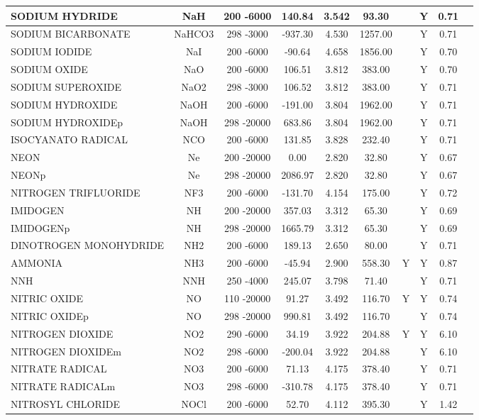 \begin{longtable}{@{\extracolsep{\fill}}|l|c|c|c|c|c|c|c|c|l|}
SODIUM HYDRIDE&NaH&200 -6000&  140.84& 3.542&    93.30& &Y& 0.71&\\ \hline
SODIUM BICARBONATE&NaHCO3&298 -3000& -937.30& 4.530&  1257.00& &Y& 0.71&\\ \hline
SODIUM IODIDE&NaI&200 -6000&  -90.64& 4.658&  1856.00& &Y& 0.70&\\ \hline
SODIUM OXIDE&NaO&200 -6000&  106.51& 3.812&   383.00& &Y& 0.70&\\ \hline
SODIUM SUPEROXIDE&NaO2&298 -3000&  106.52& 3.812&   383.00& &Y& 0.71&\\ \hline
SODIUM HYDROXIDE&NaOH&200 -6000& -191.00& 3.804&  1962.00& &Y& 0.71&\\ \hline
SODIUM HYDROXIDEp&NaOH&298 -20000&  683.86& 3.804&  1962.00& &Y& 0.71&\\ \hline
ISOCYANATO RADICAL&NCO&200 -6000&  131.85& 3.828&   232.40& &Y& 0.71&\\ \hline
NEON&Ne&200 -20000&    0.00& 2.820&    32.80& &Y& 0.67&\\ \hline
NEONp&Ne&298 -20000& 2086.97& 2.820&    32.80& &Y& 0.67&\\ \hline
NITROGEN TRIFLUORIDE&NF3&200 -6000& -131.70& 4.154&   175.00& &Y& 0.72&\\ \hline
IMIDOGEN&NH&200 -20000&  357.03& 3.312&    65.30& &Y& 0.69&\\ \hline
IMIDOGENp&NH&298 -20000& 1665.79& 3.312&    65.30& &Y& 0.69&\\ \hline
DINOTROGEN MONOHYDRIDE&NH2&200 -6000&  189.13& 2.650&    80.00& &Y& 0.71&\\ \hline
AMMONIA&NH3&200 -6000&  -45.94& 2.900&   558.30&Y&Y& 0.87&\\ \hline
NNH&NNH&250 -4000&  245.07& 3.798&    71.40& &Y& 0.71&\\ \hline
NITRIC OXIDE&NO&110 -20000&   91.27& 3.492&   116.70&Y&Y& 0.74&\\ \hline
NITRIC OXIDEp&NO&298 -20000&  990.81& 3.492&   116.70& &Y& 0.74&\\ \hline
NITROGEN DIOXIDE&NO2&290 -6000&   34.19& 3.922&   204.88&Y&Y& 6.10&\\ \hline
NITROGEN DIOXIDEm&NO2&298 -6000& -200.04& 3.922&   204.88& &Y& 6.10&\\ \hline
NITRATE RADICAL&NO3&200 -6000&   71.13& 4.175&   378.40& &Y& 0.71&\\ \hline
NITRATE RADICALm&NO3&298 -6000& -310.78& 4.175&   378.40& &Y& 0.71&\\ \hline
NITROSYL CHLORIDE&NOCl&200 -6000&   52.70& 4.112&   395.30& &Y& 1.42&\\ \hline

\end{longtable}
